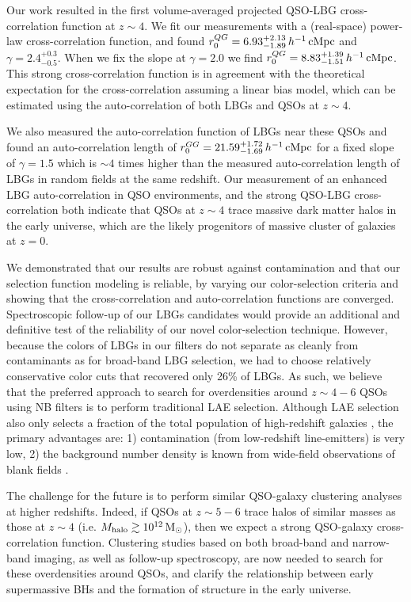 \documentclass[iop, revtex4]{emulateapj}
\begin{document}
Our work resulted in the first volume-averaged projected QSO-LBG cross-correlation function at $z\sim 4$. We fit our measurements with a
(real-space) power-law cross-correlation function, and found
$r^{QG}_{0}=6.93^{+2.13}_{-1.89} \,h^{-1}\,{\rm cMpc}$ and $\gamma=2.4^{+0.3}_{-0.5}$.
When we fix the slope at $\gamma =2.0$ we find $r^{QG}_{0}=8.83^{+1.39}_{-1.51}\,h^{-1}\,{\rm cMpc}$.
This strong cross-correlation function is in agreement with the
theoretical expectation for the cross-correlation assuming a linear bias
model, which can be estimated
using the auto-correlation of both LBGs and QSOs at $z\sim4$.

We also measured the auto-correlation function of LBGs near these QSOs and
found an auto-correlation length 
of $r^{GG}_{0}=21.59^{+1.72}_{-1.69} \,h^{-1}\,{\rm cMpc}$ for
a fixed slope of $\gamma=1.5$ which is $\sim 4$ times higher than the
measured auto-correlation length of LBGs
in random fields at the same
redshift. Our measurement of an enhanced LBG auto-correlation in QSO environments,
and the strong QSO-LBG cross-correlation both indicate that QSOs at $z\sim4$ trace massive dark
matter halos in the early universe, which are the likely progenitors of massive cluster of galaxies at $z=0$.

We demonstrated that our results are robust against
contamination and that our selection function modeling is reliable,
by varying our color-selection criteria and showing that 
the cross-correlation and auto-correlation
functions are converged.
Spectroscopic follow-up of our LBGs candidates would provide an additional
and definitive test of the reliability of our novel color-selection technique.
However, because the colors of LBGs in our filters do not separate as cleanly
from contaminants as for broad-band LBG selection, we had to choose relatively
conservative color cuts that recovered only 26\% of LBGs. As such, we believe
that the preferred approach to search for overdensities around $z\sim 4-6$ QSOs
using NB filters is to perform traditional LAE selection. Although LAE selection
also only selects a fraction of the total population of high-redshift galaxies \citep{Stark10, Stark11, Curtis12},
the primary advantages are: 1) contamination (from low-redshift line-emitters) is very low,
2) the background number density is known from wide-field observations of blank fields \citep{Hu04, Shimasaku06, Murayama07, Ouchi08}. 

The challenge for the future is to perform similar QSO-galaxy
clustering analyses at higher redshifts. Indeed, if QSOs at $z\sim 5-6$ trace
halos of similar masses as those at $z\sim4$ (i.e. $M_{\rm
  halo}\gtrsim 10^{12}\,\rm M_{\odot}$), then we expect a
strong QSO-galaxy cross-correlation function. Clustering 
studies based on  both broad-band and narrow-band imaging, as well as follow-up
spectroscopy, are now needed to search for these overdensities
around QSOs, and clarify the relationship between early supermassive BHs
and the formation of structure in the early universe.
\end{document}
